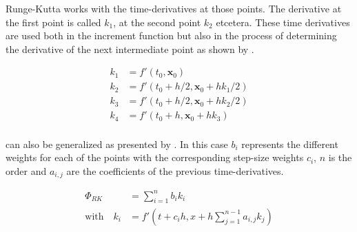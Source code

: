 \noindent
Runge-Kutta works with the time-derivatives at those points. The derivative at the first point is called $k_{1}$, at the second point $k_{2}$ etcetera. These time derivatives are used both in the increment function but also in the process of determining the derivative of the next intermediate point as shown by .

\begin{equation} \label{eq:k}
\begin{split}
k_{1}&=f'\left(t_{0},\mathbf{x}_{0}\right)\\
k_{2}&=f'\left(t_{0}+h/2,\mathbf{x}_{0}+hk_{1}/2\right)\\
k_{3}&=f'\left(t_{0}+h/2,\mathbf{x}_{0}+hk_{2}/2\right)\\
k_{4}&=f'\left(t_{0}+h,\mathbf{x}_{0}+hk_{3}\right)\\
\end{split}
\end{equation}


\noindent
{} can also be generalized as presented by . In this case $b_{i}$ represents the different weights for each of the points with the corresponding step-size weights $c_{i}$, $n$ is the order and $a_{i,j}$ are the coefficients of the previous time-derivatives.

\begin{equation} \label{eq:generalRK}
\begin{split}
\Phi_{RK} &= \displaystyle \sum^{n}_{i=1}b_{i}k_{i} \\
\text{with}\quad k_{i} &= f'\left(t+c_{i}h,x+h\displaystyle \sum^{n-1}_{j=1}a_{i,j}k_{j} \right) \\
\end{split}
\end{equation}


